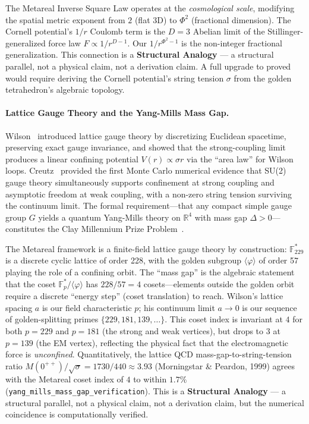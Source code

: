 The Metareal Inverse Square Law operates at the \emph{cosmological scale}, modifying the spatial metric exponent from $2$ (flat 3D) to $\Phi^2$ (fractional dimension). The Cornell potential's $1/r$ Coulomb term is the $D = 3$ Abelian limit of the Stillinger-generalized force law $F \propto 1/r^{D-1}$. Our $1/r^{\Phi^2 - 1}$ is the non-integer fractional generalization. This connection is a \textbf{Structural Analogy} --- a structural parallel, not a physical claim, not a derivation claim. A full upgrade to proved would require deriving the Cornell potential's string tension $\sigma$ from the golden tetrahedron's algebraic topology.

\paragraph{Lattice Gauge Theory and the Yang-Mills Mass Gap.}
Wilson~\cite{wilson1974} introduced lattice gauge theory by discretizing Euclidean spacetime, preserving exact gauge invariance, and showed that the strong-coupling limit produces a linear confining potential $V(r) \propto \sigma r$ via the ``area law'' for Wilson loops. Creutz~\cite{creutz1980} provided the first Monte Carlo numerical evidence that SU(2) gauge theory simultaneously supports confinement at strong coupling and asymptotic freedom at weak coupling, with a non-zero string tension surviving the continuum limit. The formal requirement---that any compact simple gauge group $G$ yields a quantum Yang-Mills theory on $\mathbb{R}^4$ with mass gap $\Delta > 0$---constitutes the Clay Millennium Prize Problem~\cite{jaffe2000}.

The Metareal framework is a finite-field lattice gauge theory by construction: $\mathbb{F}_{229}^*$ is a discrete cyclic lattice of order 228, with the golden subgroup $\langle\varphi\rangle$ of order 57 playing the role of a confining orbit. The ``mass gap'' is the algebraic statement that the coset $\mathbb{F}_p^* / \langle\varphi\rangle$ has $228/57 = 4$ cosets---elements outside the golden orbit require a discrete ``energy step'' (coset translation) to reach. Wilson's lattice spacing $a$ is our field characteristic $p$; his continuum limit $a \to 0$ is our sequence of golden-splitting primes $\{229, 181, 139, \ldots\}$. This coset index is invariant at $4$ for both $p=229$ and $p=181$ (the strong and weak vertices), but drops to $3$ at $p=139$ (the EM vertex), reflecting the physical fact that the electromagnetic force is \emph{unconfined}. Quantitatively, the lattice QCD mass-gap-to-string-tension ratio $M(0^{++})/\sqrt{\sigma} = 1730/440 \approx 3.93$ (Morningstar \& Peardon, 1999) agrees with the Metareal coset index of $4$ to within $1.7\%$ (\texttt{yang\_mills\_mass\_gap\_verification}). This is a \textbf{Structural Analogy} --- a structural parallel, not a physical claim, not a derivation claim, but the numerical coincidence is computationally verified.

